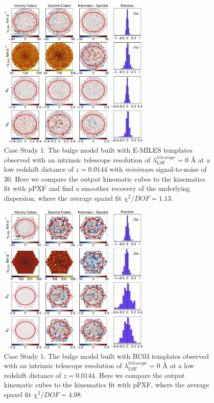 \documentclass[
  journal=pasa,
  manuscript=research-paper, %
  year=2020,
  volume=37,
]{cup-journal}
\begin{document}
\begin{figure}
    \centering
    \includegraphics[keepaspectratio, width=7.5cm]{cs1_bulge_velocities_lowz_EMILES_sn.jpeg}
    \caption{Case Study 1: The bulge model built with E-MILES templates observed with an intrinsic telescope resolution of  $\lambda_{\text{LSF}}^{telescope} = 0$ \AA{} at a low redshift distance of $z = 0.0144$ with \textit{minimum} signal-to-noise of 30. Here we compare the output kinematic cubes to the kinematics fit with pPXF and find a smoother recovery of the underlying dispersion, where the average spaxel fit $\chi^2/DOF = 1.13$.}
    \label{fig:cs1_bulge_E-MILES_sn}
\end{figure}

\begin{figure}
    \centering
    \includegraphics[keepaspectratio, width=7.5cm]{cs1_bulge_velocities_lowz_BC03hr.jpeg}
    \caption{Case Study 1: The bulge model built with BC03 templates observed with an intrinsic telescope resolution of  $\lambda_{\text{LSF}}^{telescope} = 0$ \AA{} at a low redshift distance of $z = 0.0144$. Here we compare the output kinematic cubes to the kinematics fit with pPXF, where the average spaxel fit $\chi^2/DOF = 4.08$.}
    \label{fig:cs1_bulge_BC03}
\end{figure}
\end{document}

